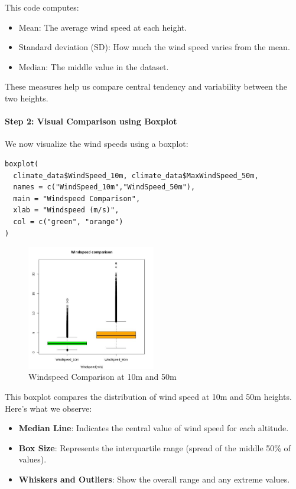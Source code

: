 This code computes:
\begin{itemize}
  \item Mean: The average wind speed at each height.
  \item Standard deviation (SD): How much the wind speed varies from the mean.
  \item Median: The middle value in the dataset.
\end{itemize}
These measures help us compare central tendency and variability between the two heights.

\paragraph{Step 2: Visual Comparison using Boxplot}

We now visualize the wind speeds using a boxplot:

\begin{verbatim}
boxplot(
  climate_data$WindSpeed_10m, climate_data$MaxWindSpeed_50m,
  names = c("WindSpeed_10m","WindSpeed_50m"),
  main = "Windspeed Comparison",
  xlab = "Windspeed (m/s)",
  col = c("green", "orange")
)
\end{verbatim}

\begin{figure}[h]
\centering
\includegraphics[width=0.5\textwidth]{figures/windspeed.jpg}
\caption{Windspeed Comparison at 10m and 50m}
\end{figure}

This boxplot compares the distribution of wind speed at 10m and 50m heights. Here’s what we observe:
\begin{itemize}
  \item \textbf{Median Line}: Indicates the central value of wind speed for each altitude.
  \item \textbf{Box Size}: Represents the interquartile range (spread of the middle 50\% of values).
  \item \textbf{Whiskers and Outliers}: Show the overall range and any extreme values.
\end{itemize}

